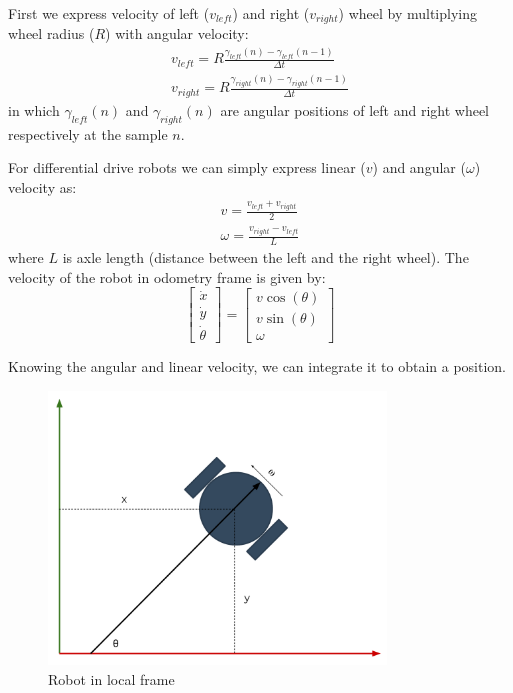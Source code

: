 First we express velocity of left ($v_{left}$) and right ($v_{right}$) wheel by multiplying wheel radius ($R$) with angular velocity:
\begin{equation}
\begin{aligned}
    v_{left} = R \frac{\gamma_{left}(n) - \gamma_{left}(n-1)}{\Delta t} \\
    v_{right} = R \frac{\gamma_{right}(n) - \gamma_{right}(n-1)}{\Delta t}
\end{aligned}
\end{equation}
in which $ \gamma_{left}(n) $ and $ \gamma_{right}(n) $ are angular positions of left and right wheel respectively at the sample $ n $.

For differential drive robots we can simply express linear ($v$) and angular ($\omega$) velocity as:
\begin{equation}
\begin{aligned}
    v = \frac{v_{left} + v_{right}}{2}  \\
    \omega = \frac{v_{right} - v_{left}}{L}
\end{aligned}
\end{equation}
where $ L $ is axle length (distance between the left and the right wheel). The velocity of the robot in odometry frame is given by:
\begin{equation}
\begin{bmatrix}
\dot{x} \\
\dot{y} \\
\dot{\theta}
\end{bmatrix} = \begin{bmatrix}
v \cos(\theta) \\
v \sin(\theta) \\
\omega
\end{bmatrix}
\end{equation}

Knowing the angular and linear velocity, we can integrate it to obtain a position.

\begin{figure}[H]
    \centering
    \includegraphics[width=0.8\textwidth]{simulation/figures/odometry.pdf}
    \caption{Robot in local frame \cite{viswanathan_introduction_nodate}}
    \label{fig:simulation:odometry_schema}
\end{figure}


